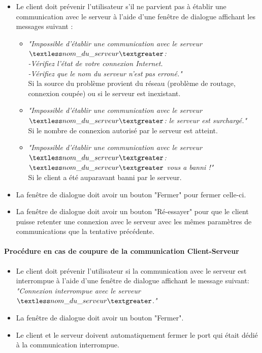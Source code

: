 \documentclass[10pt,a4paper]{report}
\begin{document}
\begin{itemize}[label = $\triangleright$]
\item Le client doit prévenir l'utilisateur s'il ne parvient pas à établir une communication avec le serveur à l'aide d'une fenêtre de dialogue affichant les messages suivant : 
\indent

\begin{itemize}
\item \textit{"Impossible d'établir une communication avec le serveur $\textless nom\_du\_serveur\textgreater$:\\
-Vérifiez l'état de votre connexion Internet.\\
-Vérifiez que le nom du serveur n'est pas erroné."\\}
Si la source du problème provient du réseau (problème de routage, connexion coupée) ou si le serveur est inexistant.

\item \textit{"Impossible d'établir une communication avec le serveur $\textless nom\_du\_serveur\textgreater$: le serveur est surchargé."\\}
Si le nombre de connexion autorisé par le serveur est atteint.

\item \textit{"Impossible d'établir une communication avec le serveur $\textless nom\_du\_serveur\textgreater$:\\
$\textless nom\_du\_serveur\textgreater$ vous a banni !"\\}
Si le client a été auparavant banni par le serveur. 
\end{itemize}

\item La fenêtre de dialogue doit avoir un bouton "Fermer" pour fermer celle-ci.

\item La fenêtre de dialogue doit avoir un bouton "Ré-essayer" pour que le client puisse retenter une connexion avec le serveur avec les mêmes paramètres de communications que la tentative précédente.
\end{itemize}


\paragraph{\textbf{Procédure en cas de coupure de la communication Client-Serveur}}

\begin{itemize}[label = $\triangleright$]
\item Le client doit prévenir l'utilisateur si la communication avec le serveur est interrompue à l'aide d'une fenêtre de dialogue affichant le message suivant:\\
\textit{"Connexion interrompue avec le serveur $\textless nom\_du\_serveur\textgreater$."}

\item La fenêtre de dialogue doit avoir un bouton "Fermer".

\item Le client et le serveur doivent automatiquement fermer le port qui était dédié à la communication interrompue.
\end{itemize}
\end{document}

